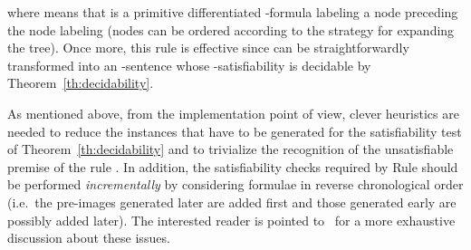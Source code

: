 \documentclass{LMCS}
\theoremstyle{plain}\newtheorem{assumption}[thm]{Assumption}
\theoremstyle{plain}\newtheorem{proposition}[thm]{Proposition}
\theoremstyle{plain}\newtheorem{property}[thm]{Property}
\theoremstyle{plain}\newtheorem{example}[thm]{Example}
\theoremstyle{plain}\newtheorem{claim}[thm]{Claim}
\theoremstyle{plain}\newtheorem{lemma}[thm]{Lemma}
\begin{document}
where  means that  is a primitive differentiated
-formula labeling a node preceding the node labeling 
(nodes can be ordered according to the strategy for expanding the
tree).
Once more, this rule is effective since  can be straightforwardly transformed into an
-sentence
whose -satisfiability is decidable by
Theorem~\ref{th:decidability}.

As mentioned above, from the implementation point of view, clever
heuristics are nee\-ded to reduce the instances that have to be
generated for the satisfiability test of Theorem~\ref{th:decidability}
and to trivialize the recognition of the unsatisfiable premise of the
rule .  In addition, the satisfiability checks
required by Rule  should be performed
\emph{incrementally} by considering formulae in reverse chronological
order (i.e.\ the pre-images generated later are added first and those
generated early are possibly added later).  The interested reader is
pointed to~\cite{afm09} for a more exhaustive discussion about these
issues.
\end{document}
